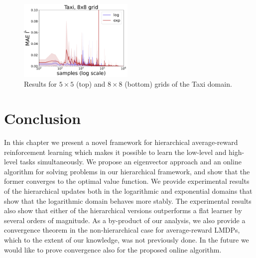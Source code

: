 \begin{figure}[!hb]
\begin{center}
        \includegraphics*[width=0.49\textwidth]{figures/chapter2/online/taxi_8_gammas_1.png}
        \caption{Results for $5 \times 5$ (top) and $8 \times 8$ (bottom) grids of the Taxi domain.}
          \label{fig:halmdps_taxi}
    \end{center}
  \end{figure}





\section{Conclusion}

In this chapter we present a novel framework for hierarchical average-reward reinforcement learning which makes it possible to learn the low-level and high-level tasks simultaneously. 
We propose an eigenvector approach and an online algorithm for solving problems in our hierarchical framework, and show that the former converges to the optimal value function. We provide experimental results of the hierarchical updates both in the logarithmic and exponential domains that show that the logarithmic domain behaves more stably. The experimental results also show that either of the hierarchical versions outperforms a flat learner by several orders of magnitude.
As a by-product of our analysis, we also provide a convergence theorem in the non-hierarchical case for average-reward LMDPs, which to the extent of our knowledge, was not previously done. In the future we would like to prove convergence also for the proposed online algorithm.
